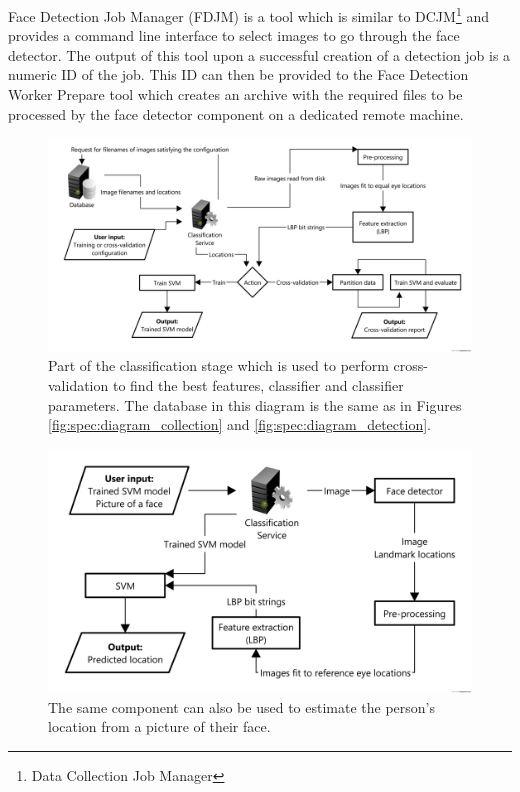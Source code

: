 Face Detection Job Manager (FDJM) is a tool which is similar to
DCJM\footnote{Data Collection Job Manager} and provides a command line
interface to select images to go through the face detector. The output of this
tool upon a successful creation of a detection job is a numeric ID of the job.
This ID can then be provided to the Face Detection Worker Prepare tool which
creates an archive with the required files to be processed by the face detector
component on a dedicated remote machine.

\begin{figure}
\begin{center}
    \includegraphics[width=\textwidth]{figures/spec/diagram_classification_cvtrain}
\end{center}
\caption{Part of the classification stage which is used to perform
cross-validation to find the best features, classifier and classifier
parameters. The database in this diagram is the same as in Figures
\ref{fig:spec:diagram_collection} and \ref{fig:spec:diagram_detection}.}
\label{fig:spec:diagram_cvtrain}
\end{figure}

\begin{figure}
\begin{center}
    \includegraphics[width=\textwidth]{figures/spec/diagram_classification_classify}
\end{center}
\caption{The same component can also be used to estimate the person's location
from a picture of their face.}
\label{fig:spec:diagram_classify}
\end{figure}

